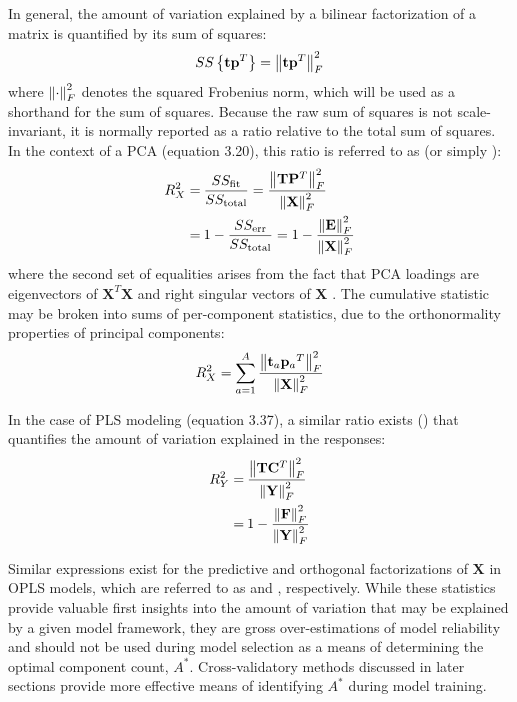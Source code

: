 \begin{doublespace}
In general, the amount of variation explained by a bilinear factorization of
a matrix is quantified by its sum of squares:
\begin{equation*}
SS \left\{ \mathbf{t} \mathbf{p}^T \right\} = \left\| \mathbf{t} \mathbf{p}^T \right\|_F^2
\end{equation*}
where $\left\| \cdot \right\|_F^2$ denotes the squared Frobenius norm, which will be used
as a shorthand for the sum of squares. Because the raw sum of squares is not
scale-invariant, it is normally reported as a ratio relative to the total sum
of squares. In the context of a PCA (equation 3.20), this ratio is referred
to as \rsqx{} (or simply \rsq{}):
\begin{align}
R^2_X
 =& \: \frac{SS_{\mathrm{fit}}{}}{SS_{\mathrm{total}}{}}
     = \frac{\left\| \mathbf{T} \mathbf{P}^T \right\|_F^2}{\left\| \mathbf{X} \right\|_F^2} \\
 =& \: 1 - \frac{SS_{\mathrm{err}}{}}{SS_{\mathrm{total}}{}}
     = 1 - \frac{\left\| \mathbf{E} \right\|_F^2}{\left\| \mathbf{X} \right\|_F^2}
\end{align}
where the second set of equalities arises from the fact that PCA loadings are
eigenvectors of $\mathbf{X}^T \mathbf{X}$ and right singular vectors of
$\mathbf{X}$ \cite{jolliffe2002}. The cumulative \rsqx{} statistic may be
broken into sums of per-component \rsqx{} statistics, due to the orthonormality
properties of principal components:
\begin{equation}
R^2_X =
 \sum_{a=1}^A
 \frac{\left\| \mathbf{t}_a {\mathbf{p}_a}^T \right\|_F^2}
      {\left\| \mathbf{X} \right\|_F^2}
\end{equation}

In the case of PLS modeling (equation 3.37), a similar ratio exists (\rsqy{})
that quantifies the amount of variation explained in the responses:
\begin{align}
R^2_Y
 =& \: \frac{\left\| \mathbf{T} \mathbf{C}^T \right\|_F^2}{\left\| \mathbf{Y} \right\|_F^2} \\
 =& \: 1 - \frac{\left\| \mathbf{F} \right\|_F^2}{\left\| \mathbf{Y} \right\|_F^2}
\end{align}

Similar expressions exist for the predictive and orthogonal factorizations of
$\mathbf{X}$ in OPLS models, which are referred to as \rsqxp{} and \rsqxo{},
respectively. While these \rsq{} statistics provide valuable first insights
into the amount of variation that may be explained by a given model framework,
they are gross over-estimations of model reliability and should not be used
during model selection as a means of determining the optimal component count,
$A^\ast$. Cross-validatory methods discussed in later sections provide more
effective means of identifying $A^\ast$ during model training.
\end{doublespace}


